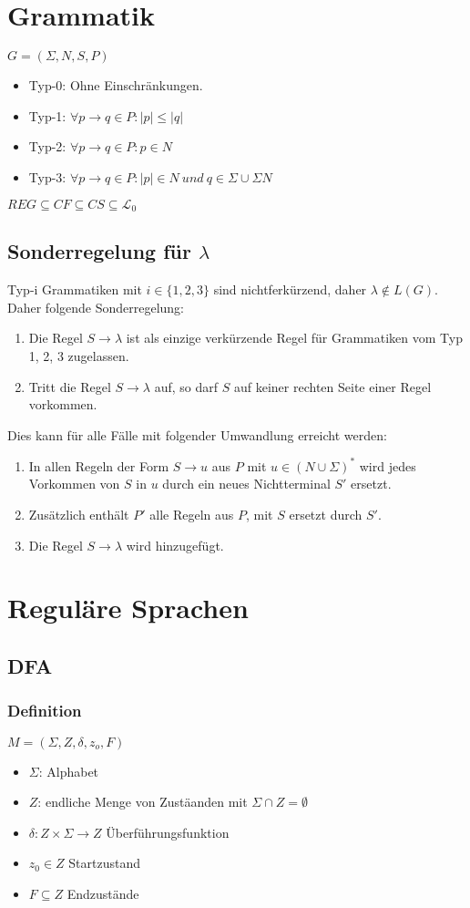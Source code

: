 \documentclass[9pt]{scrartcl}
\begin{document}
\section{Grammatik}
$G = (\Sigma, N, S, P)$
\begin{itemize}
	\item Typ-0: Ohne Einschränkungen.
	\item Typ-1: $\forall p \rightarrow q \in P : |p| \leq |q|$ 
	\item Typ-2: $\forall p \rightarrow q \in P : p \in N$ 
	\item Typ-3: $\forall p \rightarrow q \in P : |p| \in N \ und\ q \in \Sigma \cup \Sigma N$ 
\end{itemize}
$REG \subseteq CF \subseteq CS \subseteq \mathcal{L}_0$
\subsection{Sonderregelung für $\lambda$}
Typ-i Grammatiken mit $i\in \{1, 2, 3\}$ sind nichtferkürzend, daher $\lambda \notin L(G)$. Daher folgende Sonderregelung:
\begin{enumerate}
	\item Die Regel $S \rightarrow \lambda$ ist als einzige verkürzende Regel für Grammatiken vom Typ 1, 2, 3 zugelassen.
	\item Tritt die Regel $S \rightarrow \lambda$ auf, so darf $S$ auf keiner rechten Seite einer Regel vorkommen.
\end{enumerate}
Dies kann für alle Fälle mit folgender Umwandlung erreicht werden:
\begin{enumerate}
	\item In allen Regeln der Form $S \rightarrow u$ aus $P$ mit $u \in (N \cup \Sigma)^*$ wird jedes Vorkommen von $S$ in $u$ durch ein neues Nichtterminal $S'$ ersetzt.
	\item Zusätzlich enthält $P'$ alle Regeln aus $P$, mit $S$ ersetzt durch $S'$.
	\item Die Regel $S \rightarrow \lambda$ wird hinzugefügt.
\end{enumerate}

\section{Reguläre Sprachen}
\subsection{DFA}
\subsubsection{Definition}
$M=(\Sigma, Z, \delta, z_o, F)$
\begin{itemize}
	\item $\Sigma$: Alphabet
	\item $Z$: endliche Menge von Zustäanden mit $\Sigma \cap Z = \emptyset$
	\item $\delta: Z \times \Sigma \rightarrow Z$ Überführungsfunktion
	\item $z_0 \in Z$ Startzustand
	\item $F \subseteq Z$ Endzustände
\end{itemize}
\end{document}
